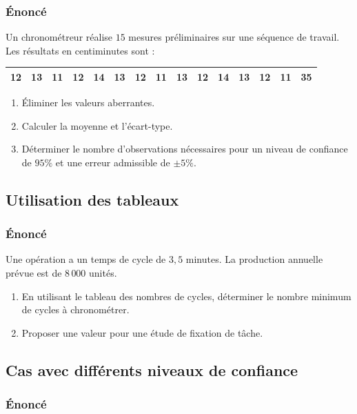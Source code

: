 \documentclass[a4paper,12pt]{article}
\begin{document}
\subsubsection*{Énoncé}

Un chronométreur réalise $15$ mesures préliminaires sur une séquence de travail. Les résultats en centiminutes sont :

\begin{center}
\begin{tabular}{|c|c|c|c|c|c|c|c|c|c|c|c|c|c|c|}
\hline
12 & 13 & 11 & 12 & 14 & 13 & 12 & 11 & 13 & 12 & 14 & 13 & 12 & 11 & 35 \\
\hline
\end{tabular}
\end{center}

\begin{enumerate}
    \item Éliminer les valeurs aberrantes.
    \item Calculer la moyenne et l'écart-type.
    \item Déterminer le nombre d'observations nécessaires pour un niveau de confiance de $95\%$ et une erreur admissible de $\pm 5\%$.
\end{enumerate}

\subsection{Utilisation des tableaux}

\subsubsection*{Énoncé}

Une opération a un temps de cycle de $3,5$ minutes. La production annuelle prévue est de $8\,000$ unités.

\begin{enumerate}
    \item En utilisant le tableau des nombres de cycles, déterminer le nombre minimum de cycles à chronométrer.
    \item Proposer une valeur pour une étude de fixation de tâche.
\end{enumerate}

\subsection{Cas avec différents niveaux de confiance}

\subsubsection*{Énoncé}
\end{document}
